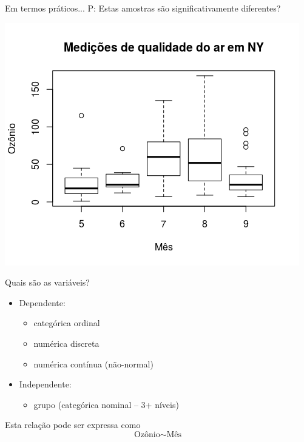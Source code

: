 \documentclass{beamer}
\begin{document}
\begin{frame}{Em termos práticos...}
P: Estas amostras são significativamente diferentes?

  \centering
  \includegraphics[height=.9\textheight]{Cap37-38/3samples-bp}
\end{frame}

\begin{frame}{Quais são as variáveis?}
  \begin{itemize}
    \small
  \item Dependente:
    \begin{itemize}
      \footnotesize
    \item categórica ordinal
    \item numérica discreta
    \item numérica contínua (não-normal)
    \end{itemize}
  \item Independente:
    \begin{itemize}
      \footnotesize
    \item grupo (categórica nominal -- 3+ níveis)
    \end{itemize}
  \end{itemize}
  \vfill
  \begin{block}{Esta relação pode ser expressa como}
    \begin{displaymath}
      \text{Ozônio} \sim \text{Mês}
    \end{displaymath}
  \end{block}
\end{frame}
\end{document}
